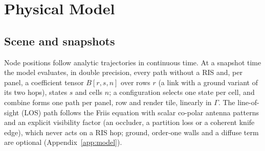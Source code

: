 \section{Physical Model}\label{sec:model}

\subsection{Scene and snapshots}\label{sec:model-stack}
Node positions follow analytic trajectories in continuous time. At a snapshot
time the model evaluates, in double precision, every path without a RIS and, per panel, a
coefficient tensor $B[r,s,n]$ over rows $r$ (a link with a ground variant of its two hops),
states $s$ and cells $n$; a configuration selects one state per cell, and $\mathrm{combine}$
forms one path per panel, row and render tile, linearly in $\Gamma$. The line-of-sight (LOS) path follows the
Friis equation with scalar co-polar antenna patterns and an explicit visibility factor (an
occluder, a partition loss or a coherent knife edge), which never acts on a RIS hop; ground,
order-one walls and a diffuse term are optional (Appendix~\ref{app:model}).

